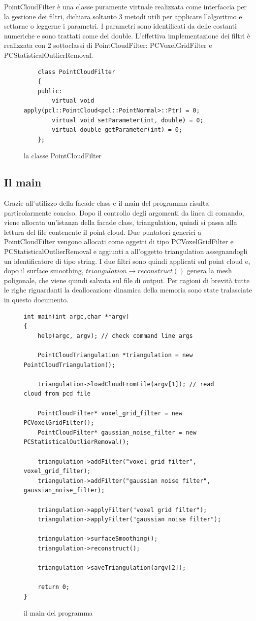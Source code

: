 \documentclass[a4paper,12pt]{article}
\begin{document}
	PointCloudFilter è una classe puramente virtuale realizzata come interfaccia per la gestione dei filtri,
	dichiara soltanto 3 metodi utili per applicare l'algoritmo e settarne o leggerne i parametri.
	I parametri sono identificati da delle costanti numeriche e sono trattati come dei double.
	L'effettiva implementazione dei filtri è realizzata con 2 sottoclassi di PointCloudFilter: PCVoxelGridFilter
	e PCStatisticalOutlierRemoval.
	\ 
	\begin{figure}[H]
	\begin{lstlisting}
	class PointCloudFilter
	{
	public:
    	virtual void apply(pcl::PointCloud<pcl::PointNormal>::Ptr) = 0;
    	virtual void setParameter(int, double) = 0;
    	virtual double getParameter(int) = 0;
	};
	\end{lstlisting}
	\label{fig:PointCloudFilter}
	\caption{la classe PointCloudFilter}
	\end{figure}
	\clearpage
	\subsection{Il main}
	Grazie all'utilizzo della facade class e il main del programma risulta particolarmente conciso.
	Dopo il controllo degli argomenti da linea di comando, viene allocata un'istanza della facade class, 
	triangulation, quindi si passa alla lettura del file contenente il point cloud. 
	Due puntatori generici a PointCloudFilter vengono allocati come oggetti di tipo PCVoxelGridFilter e
	PCStatisticalOutlierRemoval e aggiunti a all'oggetto triangulation assegnandogli un identificatore di
	tipo string. I due filtri sono quindi applicati sul point cloud e, dopo il surface smoothing, 
	$triangulation\rightarrow reconstruct()$ genera la mesh poligonale, che viene quindi salvata sul file di output.
	Per ragioni di brevità tutte le righe riguardanti la deallocazione dinamica della memoria sono state tralasciate in questo documento.
	\begin{figure}[H]
	\begin{lstlisting}
int main(int argc,char **argv)
{
    help(argc, argv); // check command line args
    
    PointCloudTriangulation *triangulation = new PointCloudTriangulation();

    triangulation->loadCloudFromFile(argv[1]); // read cloud from pcd file

    PointCloudFilter* voxel_grid_filter = new PCVoxelGridFilter();
    PointCloudFilter* gaussian_noise_filter = new PCStatisticalOutlierRemoval();

    triangulation->addFilter("voxel grid filter", voxel_grid_filter);
    triangulation->addFilter("gaussian noise filter", gaussian_noise_filter);

    triangulation->applyFilter("voxel grid filter");
    triangulation->applyFilter("gaussian noise filter");

    triangulation->surfaceSmoothing();
    triangulation->reconstruct();

    triangulation->saveTriangulation(argv[2]);

    return 0;
}
	\end{lstlisting}
	\label{fig:main}
	\caption{il main del programma}	
	\end{figure}
	\clearpage
\end{document}
